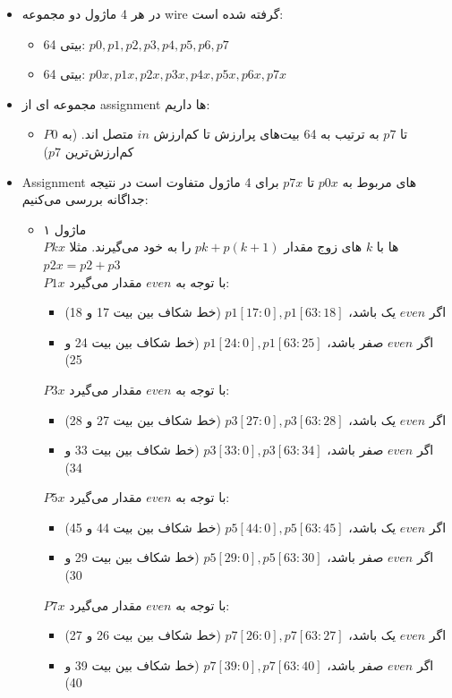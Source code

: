 \begin{itemize}
\item
در هر 4 ماژول دو مجموعه wire گرفته شده است:
\begin{itemize}
\item
64 بیتی: $p0, p1, p2, p3, p4, p5, p6, p7$
\item
64 بیتی: $ p0x,p1x,p2x,p3x,p4x,p5x,p6x,p7x$
\end{itemize}
\item
مجموعه ای از assignment ها داریم:
\begin{itemize}
\item
$P0$ تا $p7$ به ترتیب به 64 بیت‌های پرارزش تا کم‌ارزش $in$ متصل اند. 
(به کم‌ارزش‌ترین $p7$)
\end{itemize}
\item
Assignment های مربوط به $p0x$ تا $p7x$ برای 4 ماژول متفاوت است در نتیجه جداگانه بررسی می‌کنیم:
\begin{itemize}
\item ماژول ۱\\
$Pkx$ ها با $k$ های زوج مقدار $pk + p(k+1)$ را به خود می‌گیرند. مثلا $p2x = p2 + p3$\\
$P1x$ با توجه به $even$ مقدار می‌گیرد: 
\begin{itemize}
\item
اگر $even$ یک باشد، { $p1[17:0], p1[63:18]$ } (خط شکاف بین بیت 17 و 18)
\item
اگر $even$ صفر باشد، { $p1[24:0], p1[63:25]$ } (خط شکاف بین بیت 24 و 25)
\end{itemize}
   $P3x$ با توجه به $even$ مقدار می‌گیرد: 
 \begin{itemize}
 \item
 اگر $even$ یک باشد، { $p3[27:0], p3[63:28]$ }  (خط شکاف بین بیت 27 و 28)
\item 
اگر $even$ صفر باشد، { $p3[33:0], p3[63:34]$ } (خط شکاف بین بیت 33 و 34)

 \end{itemize}
   $P5x$ با توجه به $even$ مقدار می‌گیرد:
   \begin{itemize}
   \item
   اگر $even$ یک باشد، { $p5[44:0], p5[63:45]$ }  (خط شکاف بین بیت 44 و 45)
   \item
اگر $even$ صفر باشد، { $p5[29:0], p5[63:30]$ } (خط شکاف بین بیت 29 و 30)
\end{itemize}    
   $P7x$ با توجه به $even$ مقدار می‌گیرد: 
   \begin{itemize}
   \item
   اگر $even$ یک باشد، { $p7[26:0], p7[63:27]$ }  (خط شکاف بین بیت 26 و 27)
   \item
اگر $even$ صفر باشد، { $p7[39:0], p7[63:40]$ } (خط شکاف بین بیت 39 و 40)


\end{itemize}
\end{itemize}
\end{itemize}
